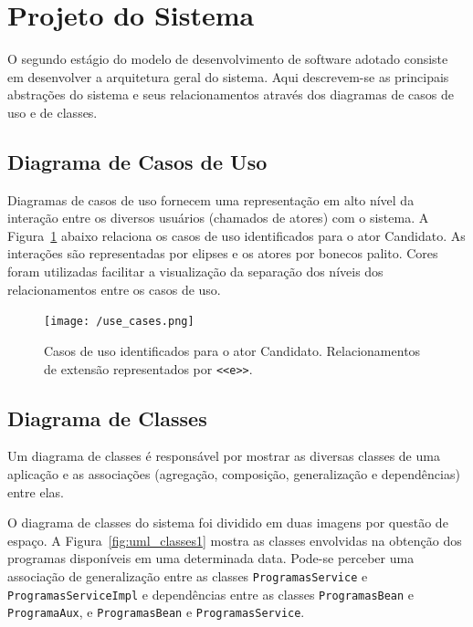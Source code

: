 \documentclass[
  10.5pt,				  %
	openright,			%
	twoside,			  %
  a5paper,
  chapter=TITLE,	%
	section=TITLE,	%
  hyphens,        %
	english,        %
	brazil          %
]{abntex2}
\begin{document}
\section{Projeto do Sistema}

O segundo estágio do modelo de desenvolvimento de software adotado consiste em desenvolver a arquitetura geral do sistema. Aqui descrevem-se as principais abstrações do sistema e seus relacionamentos através dos diagramas de casos de uso e de classes.

\subsection{Diagrama de Casos de Uso}\label{sec:casos_uso}

Diagramas de casos de uso fornecem uma representação em alto nível da interação entre os diversos usuários (chamados de atores) com o sistema. A Figura~\ref{fig:use_cases} abaixo relaciona os casos de uso identificados para o ator Candidato. As interações são representadas por elipses e os atores por bonecos palito. Cores foram utilizadas facilitar a visualização da separação dos níveis dos relacionamentos entre os casos de uso.

\begin{figure}[!ht]
  \caption{\label{fig:use_cases} Casos de uso identificados para o ator Candidato. Relacionamentos de extensão representados por \texttt{<<e>>}. }
  \begin{center}
    \texttt{[image: /use\_cases.png]}
  \end{center}
\end{figure}

\subsection{Diagrama de Classes}

Um diagrama de classes é responsável por mostrar as diversas classes de uma aplicação e as associações (agregação, composição, generalização e dependências) entre elas.

O diagrama de classes do sistema foi dividido em duas imagens por questão de espaço. A Figura~\ref{fig:uml_classes1} mostra as classes envolvidas na obtenção dos programas disponíveis em uma determinada data. Pode-se perceber uma associação de generalização entre as classes \texttt{ProgramasService} e \texttt{ProgramasServiceImpl} e dependências entre as classes \texttt{ProgramasBean} e \texttt{ProgramaAux}, e \texttt{ProgramasBean} e \texttt{ProgramasService}.
\end{document}
